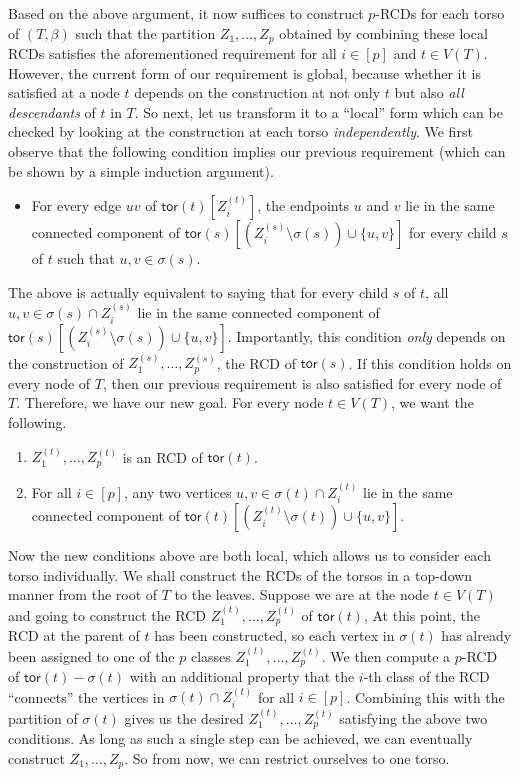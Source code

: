 \documentclass[a4paper,11pt]{article}
\numberwithin{lemma}{section}
\newcommand{\tor}{\mathsf{tor}}
\begin{document}
Based on the above argument, it now suffices to construct $p$-RCDs for each torso of $(T,\beta)$ such that the partition $Z_1,\dots,Z_p$ obtained by combining these local RCDs satisfies the aforementioned requirement for all $i \in [p]$ and $t \in V(T)$.
However, the current form of our requirement is global, because whether it is satisfied at a node $t$ depends on the construction at not only $t$ but also \emph{all descendants} of $t$ in $T$.
So next, let us transform it to a ``local'' form which can be checked by looking at the construction at each torso \emph{independently}.
We first observe that the following condition implies our previous requirement (which can be shown by a simple induction argument).
\begin{itemize}
 \item[] For every edge $uv$ of $\tor(t)[Z_i^{(t)}]$, the endpoints $u$ and $v$ lie in the same connected component of $\tor(s)[(Z_i^{(s)} \setminus \sigma(s)) \cup \{u,v\}]$ for every child $s$ of $t$ such that $u,v \in \sigma(s)$.
\end{itemize}
The above is actually equivalent to saying that for every child $s$ of $t$, all $u,v \in \sigma(s) \cap Z_i^{(s)}$ lie in the same connected component of $\tor(s)[(Z_i^{(s)} \setminus \sigma(s)) \cup \{u,v\}]$.
Importantly, this condition \emph{only} depends on the construction of $Z_1^{(s)},\dots,Z_p^{(s)}$, the RCD of $\tor(s)$.
If this condition holds on every node of $T$, then our previous requirement is also satisfied for every node of $T$.
Therefore, we have our new goal.
For every node $t \in V(T)$, we want the following.

\begin{enumerate}[label = (\Alph*)]
 \item $Z_1^{(t)},\dots,Z_p^{(t)}$ is an RCD of $\tor(t)$.
 \item For all $i \in [p]$, any two vertices $u,v \in \sigma(t) \cap Z_i^{(t)}$ lie in the same connected component of $\tor(t)[(Z_i^{(t)} \setminus \sigma(t)) \cup \{u,v\}]$.
\end{enumerate}

Now the new conditions above are both local, which allows us to consider each torso individually.
We shall construct the RCDs of the torsos in a top-down manner from the root of $T$ to the leaves.
Suppose we are at the node $t \in V(T)$ and going to construct the RCD $Z_1^{(t)},\dots,Z_p^{(t)}$ of $\tor(t)$,
At this point, the RCD at the parent of $t$ has been constructed, so each vertex in $\sigma(t)$ has already been assigned to one of the $p$ classes $Z_1^{(t)},\dots,Z_p^{(t)}$.
We then compute a $p$-RCD of $\tor(t) - \sigma(t)$ with an additional property that the $i$-th class of the RCD ``connects'' the vertices in $\sigma(t) \cap Z_i^{(t)}$ for all $i \in [p]$.
Combining this with the partition of $\sigma(t)$ gives us the desired $Z_1^{(t)},\dots,Z_p^{(t)}$ satisfying the above two conditions.
As long as such a single step can be achieved, we can eventually construct $Z_1,\dots,Z_p$.
So from now, we can restrict ourselves to one torso.
\end{document}
